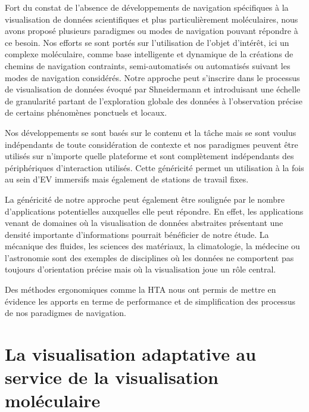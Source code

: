 Fort du constat de l'absence de développements de navigation spécifiques à la visualisation de données scientifiques et plus particulièrement moléculaires, nous avons proposé plusieurs paradigmes ou modes de navigation pouvant répondre à ce besoin. Nos efforts se sont portés sur l'utilisation de l'objet d'intérêt, ici un complexe moléculaire, comme base intelligente et dynamique de la créations de chemins de navigation contraints, semi-automatisés ou automatisés suivant les modes de navigation considérés. Notre approche peut s'inscrire dans le processus de visualisation de données évoqué par Shneidermann et introduisant une échelle de granularité partant de l'exploration globale des données à l'observation précise de certains phénomènes ponctuels et locaux.

Nos développements se sont basés sur le contenu et la tâche mais se sont voulus indépendants de toute considération de contexte et nos paradigmes peuvent être utilisés sur n'importe quelle plateforme et sont complètement indépendants des périphériques d'interaction utilisés. Cette généricité permet un utilisation à la fois au sein d'EV immersifs mais également de stations de travail fixes.

La généricité de notre approche peut également être soulignée par le nombre d'applications potentielles auxquelles elle peut répondre. En effet, les applications venant de domaines où la visualisation de données abstraites présentant une densité importante d'informations pourrait bénéficier de notre étude. La mécanique des fluides, les sciences des matériaux, la climatologie, la médecine ou l'astronomie sont des exemples de disciplines où les données ne comportent pas toujours d'orientation précise mais où la visualisation joue un rôle central.

Des méthodes ergonomiques comme la HTA nous ont permis de mettre en évidence les apports en terme de performance et de simplification des processus de nos paradigmes de navigation. 


\section{La visualisation adaptative au service de la visualisation moléculaire}

